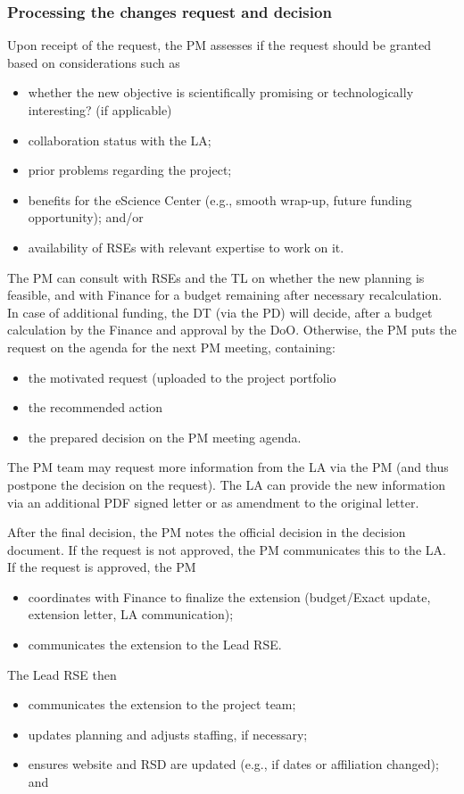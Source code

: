 \subsubsection{Processing the changes request and decision}
Upon receipt of the request, the PM assesses if the request should be granted based on considerations such as 
\begin{itemize}\itemsep0em
\item whether the new objective is scientifically promising or technologically interesting? (if applicable)
\item collaboration status with the LA;
\item prior problems regarding the project;
\item benefits for the eScience Center (e.g., smooth wrap-up, future funding opportunity); and/or
\item availability of RSEs with relevant expertise to work on it.
\end{itemize}

The PM can consult with RSEs and the TL on whether the new planning is feasible, and with Finance for a budget remaining after necessary recalculation. In case of additional funding, the DT
(via the PD) will decide, after a budget calculation by the Finance and approval by the DoO. Otherwise, the PM puts the
request on the agenda for the next PM meeting, containing: 
\begin{itemize}\itemsep0em
\item the motivated request (uploaded to the project portfolio
\item the recommended action
\item the prepared decision on the PM meeting agenda.
\end{itemize}

The PM team may request more information from the LA via the PM (and thus postpone the decision on the request). The LA
can provide the new information via an additional PDF signed letter or as amendment to the original letter.

After the final decision, the PM notes the official decision in the decision document. If the request is not approved,
the PM communicates this to the LA. If the request is approved, the PM
\begin{itemize}\itemsep0em
\item coordinates with Finance to finalize the extension (budget/Exact update, extension letter, LA communication);
\item communicates the extension to the Lead RSE.
\end{itemize}  
  The Lead RSE then 
\begin{itemize}  
\item communicates the extension to the project team;
\item updates planning and adjusts staffing, if necessary;
\item ensures website and RSD are updated (e.g., if dates or affiliation changed); and
\end{itemize}

